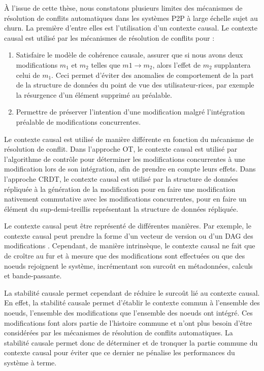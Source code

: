 \label{sec:manual-merge}

À l'issue de cette thèse, nous constatons plusieurs limites des mécanismes de résolution de conflits automatiques dans les systèmes \ac{P2P} à large échelle sujet au churn.
La première d'entre elles est l'utilisation d'un contexte causal.
Le contexte causal est utilisé par les mécanismes de résolution de conflits pour :
\begin{enumerate}
    \item Satisfaire le modèle de cohérence causale, \ie assurer que si nous avons deux modifications $m_1$ et $m_2$ telles que $m1 \to m_2$, alors l'effet de $m_2$ supplantera celui de $m_1$.
        Ceci permet d'éviter des anomalies de comportement de la part de la structure de données du point de vue des utilisateur-rices, par exemple la résurgence d'un élément supprimé au préalable.
    \item Permettre de préserver l'intention d'une modification malgré l'intégration préalable de modifications concurrentes.
\end{enumerate}

Le contexte causal est utilisé de manière différente en fonction du mécanisme de résolution de conflit.
Dans l'approche \ac{OT}, le contexte causal est utilisé par l'algorithme de contrôle pour déterminer les modifications concurrentes à une modification lors de son intégration, afin de prendre en compte leurs effets.
Dans l'approche \ac{CRDT}, le contexte causal est utilisé par la structure de données répliquée à la génération de la modification pour en faire une modification nativement commutative avec les modifications concurrentes, \ie pour en faire un élément du sup-demi-treillis représentant la structure de données répliquée.

Le contexte causal peut être représenté de différentes manières.
Par exemple, le contexte causal peut prendre la forme d'un vecteur de version \cite{1988-version-vector-mattern,1991-version-vector-fidge} ou d'un \ac{DAG} des modifications \cite{1997-causal-barrier}.
Cependant, de manière intrinsèque, le contexte causal ne fait que de croître au fur et à mesure que des modifications sont effectuées ou que des noeuds rejoignent le système, incrémentant son surcoût en métadonnées, calculs et bande-passante.

La stabilité causale permet cependant de réduire le surcoût lié au contexte causal.
En effet, la stabilité causale permet d'établir le contexte commun à l'ensemble des noeuds, \ie l'ensemble des modifications que l'ensemble des noeuds ont intégré.
Ces modifications font alors partie de l'histoire commune et n'ont plus besoin d'être considérées par les mécanismes de résolution de conflits automatiques.
La stabilité causale permet donc de déterminer et de tronquer la partie commune du contexte causal pour éviter que ce dernier ne pénalise les performances du système à terme.

